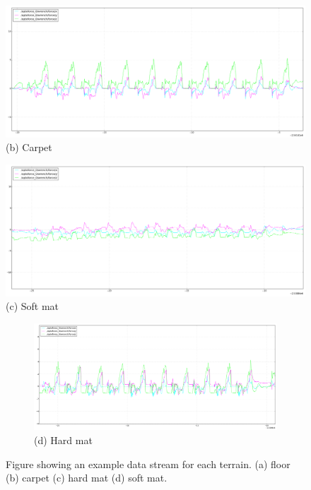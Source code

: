 \documentclass[USenglish]{ifimaster}  %
\begin{document}
\begin{figure}[h]
	\centering
	\includegraphics[width=\textwidth,height=\textheight,keepaspectratio]{Figures/teppegraf}
	\captionsetup{labelformat=empty}
	\caption{(b) Carpet}
	\label{fig:teppegraf}
\end{figure}

\begin{figure}[h]
	\centering
	\includegraphics[width=\textwidth,height=\textheight,keepaspectratio]{Figures/mykmattegraf}
	\captionsetup{labelformat=empty}
	\caption{(c) Soft mat}
	\label{fig:mykmattegraf}
\end{figure}

\setcounter{figure}{0}
\begin{figure}[h]
	\centering
	\begin{subfigure}[t]{\textwidth}
		\includegraphics[width=\textwidth,height=\textheight,keepaspectratio]{Figures/mattebgraf}
		\captionsetup{labelformat=empty}
		\caption{(d) Hard mat}
		\label{fig:mattebgraf} 
	\end{subfigure}
	\caption{Figure showing an example data stream for each terrain. (a) floor (b) carpet (c) hard mat (d) soft mat.}
	\label{fig:gtmgraf}
\end{figure}
\FloatBarrier
\end{document}
